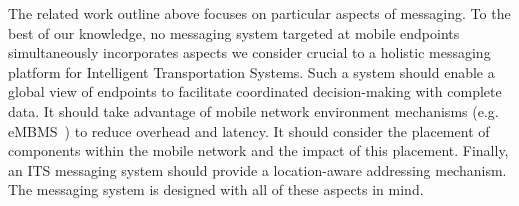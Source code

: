 The related work outline above focuses on particular aspects of
messaging.  To the best of our knowledge, no messaging system targeted
at mobile endpoints simultaneously incorporates aspects we consider
crucial to a holistic messaging platform for Intelligent
Transportation Systems.  Such a system should enable a global view of
endpoints to facilitate coordinated decision-making with complete
data. It should take advantage of mobile network environment
mechanisms (e.g. eMBMS~\cite{lecompte2012evolved}) to reduce overhead and 
latency. It should
consider the placement of components within the mobile network and the
impact of this placement.  Finally, an ITS messaging system should
provide a location-aware addressing mechanism. The \name{} messaging
system is designed with all of these aspects in mind.
